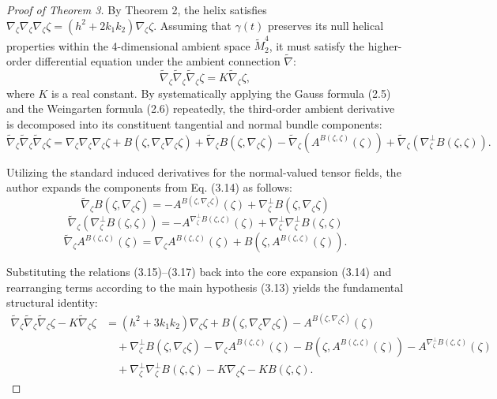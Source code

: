 \documentclass [reqno]{amsart}
\theoremstyle{plain}
\numberwithin{equation}{section}
\begin{document}
\begin{proof}[Proof of Theorem 3]
By Theorem 2, the helix satisfies $\nabla_\zeta \nabla_\zeta \nabla_\zeta \zeta=(h^2+2k_1 k_2)\nabla_\zeta \zeta$. Assuming that $\gamma(t)$ preserves its null helical properties within the 4-dimensional ambient space $\tilde{M}_2^4$, it must satisfy the higher-order differential equation under the ambient connection $\tilde{\nabla}$:
\begin{equation}
\tilde{\nabla}_\zeta \tilde{\nabla}_\zeta \tilde{\nabla}_\zeta \zeta=K\tilde{\nabla}_\zeta \zeta,
\end{equation}
where $K$ is a real constant. By systematically applying the Gauss formula (2.5) and the Weingarten formula (2.6) repeatedly, the third-order ambient derivative is decomposed into its constituent tangential and normal bundle components:
\begin{equation}
\tilde{\nabla}_\zeta \tilde{\nabla}_\zeta \tilde{\nabla}_\zeta \zeta=\nabla_\zeta \nabla_\zeta \nabla_\zeta \zeta+B(\zeta,\nabla_\zeta \nabla_\zeta \zeta)+\tilde{\nabla}_\zeta B(\zeta,\nabla_\zeta \zeta) -\tilde{\nabla}_\zeta (A^{B(\zeta,\zeta)}(\zeta))+\tilde{\nabla}_\zeta (\nabla_\zeta^\perp B(\zeta,\zeta)).
\end{equation}

Utilizing the standard induced derivatives for the normal-valued tensor fields, the author expands the components from Eq. (3.14) as follows:
\begin{equation}
\tilde{\nabla}_\zeta B(\zeta,\nabla_\zeta \zeta)=-A^{B(\zeta,\nabla_\zeta \zeta)}(\zeta)+\nabla_\zeta^\perp B(\zeta,\nabla_\zeta \zeta)
\end{equation}
\begin{equation}
\tilde{\nabla}_\zeta (\nabla_\zeta^\perp B(\zeta,\zeta))=-A^{\nabla_\zeta^\perp B(\zeta,\zeta)}(\zeta)+\nabla_\zeta^\perp \nabla_\zeta^\perp B(\zeta,\zeta)
\end{equation}
\begin{equation}
\tilde{\nabla}_\zeta A^{B(\zeta,\zeta)}(\zeta)=\nabla_\zeta A^{B(\zeta,\zeta)}(\zeta)+B(\zeta,A^{B(\zeta,\zeta)}(\zeta)).
\end{equation}

Substituting the relations (3.15)--(3.17) back into the core expansion (3.14) and rearranging terms according to the main hypothesis (3.13) yields the fundamental structural identity:
\begin{equation}
\begin{aligned}
\tilde{\nabla}_\zeta \tilde{\nabla}_\zeta \tilde{\nabla}_\zeta \zeta-K\tilde{\nabla}_\zeta \zeta &= (h^2+3k_1 k_2)\nabla_\zeta \zeta+B(\zeta,\nabla_\zeta \nabla_\zeta \zeta)-A^{B(\zeta,\nabla_\zeta \zeta)}(\zeta) \\
&\quad +\nabla_\zeta^\perp B(\zeta,\nabla_\zeta \zeta)-\nabla_\zeta A^{B(\zeta,\zeta)}(\zeta)-B(\zeta,A^{B(\zeta,\zeta)}(\zeta))-A^{\nabla_\zeta^\perp B(\zeta,\zeta)}(\zeta) \\
&\quad +\nabla_\zeta^\perp \nabla_\zeta^\perp B(\zeta,\zeta)-K\nabla_\zeta \zeta-KB(\zeta,\zeta).
\end{aligned}
\end{equation}


\end{proof}
\end{document}
